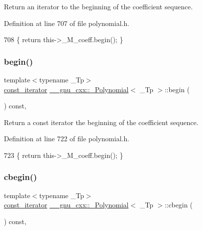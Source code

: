 Return an iterator to the beginning of the coefficient sequence. 

Definition at line 707 of file polynomial.\+h.


\begin{DoxyCode}
708       \{ \textcolor{keywordflow}{return} this->\_M\_coeff.begin(); \}
\end{DoxyCode}
\mbox{\label{class____gnu__cxx_1_1__Polynomial_a57902287656245f5ae1ee7406b419c9b}} 
\subsubsection{\texorpdfstring{begin()}{begin()}\hspace{0.1cm}{\footnotesize\ttfamily [2/2]}}
{\footnotesize\ttfamily template$<$typename \+\_\+\+Tp$>$ \\
\hyperlink{class____gnu__cxx_1_1__Polynomial_a96e4523cc2a834724fe4224f0800486b}{const\+\_\+iterator} \hyperlink{class____gnu__cxx_1_1__Polynomial}{\+\_\+\+\_\+gnu\+\_\+cxx\+::\+\_\+\+Polynomial}$<$ \+\_\+\+Tp $>$\+::begin (\begin{DoxyParamCaption}{ }\end{DoxyParamCaption}) const\hspace{0.3cm}{\ttfamily [inline]}, {\ttfamily [noexcept]}}

Return a {\ttfamily const} iterator the beginning of the coefficient sequence. 

Definition at line 722 of file polynomial.\+h.


\begin{DoxyCode}
723       \{ \textcolor{keywordflow}{return} this->\_M\_coeff.begin(); \}
\end{DoxyCode}
\mbox{\label{class____gnu__cxx_1_1__Polynomial_a3309265141727a7581036a2b7632c689}} 
\subsubsection{\texorpdfstring{cbegin()}{cbegin()}}
{\footnotesize\ttfamily template$<$typename \+\_\+\+Tp$>$ \\
\hyperlink{class____gnu__cxx_1_1__Polynomial_a96e4523cc2a834724fe4224f0800486b}{const\+\_\+iterator} \hyperlink{class____gnu__cxx_1_1__Polynomial}{\+\_\+\+\_\+gnu\+\_\+cxx\+::\+\_\+\+Polynomial}$<$ \+\_\+\+Tp $>$\+::cbegin (\begin{DoxyParamCaption}{ }\end{DoxyParamCaption}) const\hspace{0.3cm}{\ttfamily [inline]}, {\ttfamily [noexcept]}}

